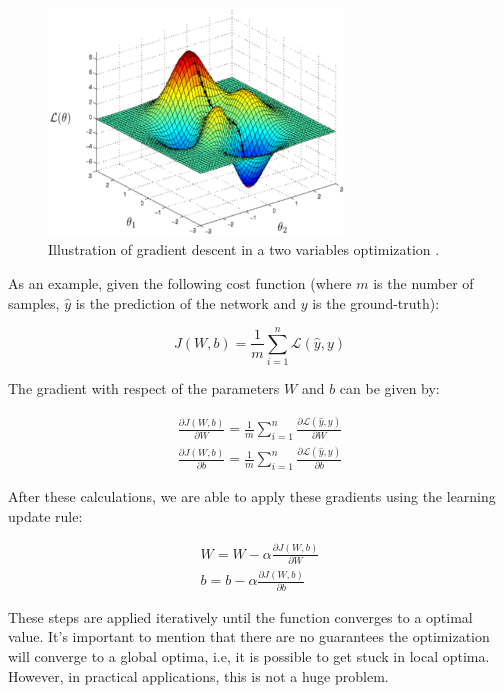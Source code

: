 \begin{figure}[!htbp]
	\centering
	\includegraphics[width=0.7\textwidth]{Cap3/gradientdescent.eps}
	\caption{Illustration of gradient descent in a two variables optimization
	\cite{tgilharco}.
	}
	\label{fig:gradientdescent}
\end{figure}


As an example, given the following cost function (where $m$ is the number of samples, $\hat{y}$ is the prediction of the network and $y$ is the ground-truth):

\begin{equation}
J(W,b) = \frac{1}{m}\sum^{n}_{i = 1}\mathcal{L}(\hat{y}, y)
\end{equation}


The gradient with respect of the parameters $W$ and $b$ can be given by:

\begin{align}
\frac{\partial{J(W,b)}}{\partial{W}} = \frac{1}{m}\sum^{n}_{i = 1}\frac{\partial{\mathcal{L}(\hat{y}, y)}}{\partial{W}}\\
\frac{\partial{J(W,b)}}{\partial{b}} = \frac{1}{m}\sum^{n}_{i = 1}\frac{\partial{\mathcal{L}(\hat{y}, y)}}{\partial{b}}
\end{align}

After these calculations, we are able to apply these gradients using the learning update rule:


\begin{align}
W = W - \alpha\frac{\partial{J(W,b)}}{\partial{W}}\\
b = b - \alpha\frac{\partial{J(W,b)}}{\partial{b}}
\end{align}

These steps are applied iteratively until the function converges to a optimal value. It's important to mention that there are no guarantees the optimization will converge to a global optima, i.e, it is possible to get stuck in local optima. However, in practical applications, this is not a huge problem.

